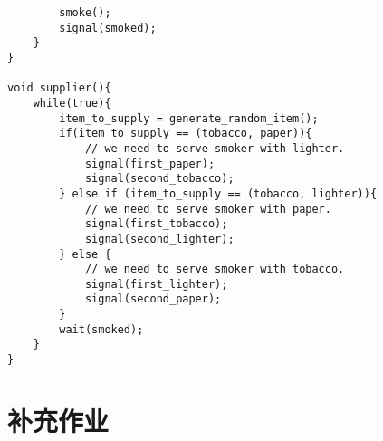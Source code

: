 \documentclass{ctexart}
\begin{document}
\begin{outline}[enumerate]
\begin{verbatim}
        smoke();
        signal(smoked);
    }
}

void supplier(){
    while(true){
        item_to_supply = generate_random_item();
        if(item_to_supply == (tobacco, paper)){
            // we need to serve smoker with lighter.
            signal(first_paper);
            signal(second_tobacco);
        } else if (item_to_supply == (tobacco, lighter)){
            // we need to serve smoker with paper.
            signal(first_tobacco);
            signal(second_lighter);
        } else {
            // we need to serve smoker with tobacco.
            signal(first_lighter);
            signal(second_paper);
        }
        wait(smoked);
    }
}
\end{verbatim}
\end{outline}

\section*{补充作业}
\end{document}
